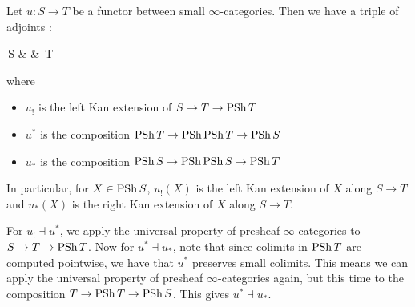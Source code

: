 \documentclass[./main.tex]{subfiles}
\begin{document}
\begin{lem}
  
  Let $u : S \to T$ be a functor between small $\infty$-categories.
  Then we have a triple of adjoints : 
  \begin{cd}
    {\,S} & {} & {\,T}
    \arrow["{u^*}"{description}, from=1-3, to=1-1]
    \arrow["{\mathrm{u_!}}", shift left=5, from=1-1, to=1-3]
    \arrow["{u_*}"', shift right=5, from=1-1, to=1-3]
    \arrow["\bot"{description}, shift left=3, draw=none, from=1-1, to=1-3]
    \arrow["\bot"{description}, shift right=3, draw=none, from=1-1, to=1-3]
  \end{cd}
  where 
  \begin{itemize}
    \item $u_!$ is the left Kan extension of $S \to T \to \mathrm{PSh}\,T$
    \item $u^*$ is the composition $\mathrm{PSh}\,T \to \mathrm{PSh}\,\mathrm{PSh}\,T \to \mathrm{PSh}\,S$
    \item $u_*$ is the composition $\mathrm{PSh}\,S \to \mathrm{PSh}\,\mathrm{PSh}\,S \to \mathrm{PSh}\,T$
  \end{itemize}
  In particular, for $X \in \mathrm{PSh}\,S$,
  $u_!(X)$ is the left Kan extension of $X$ along $S \to T$
  and $u_*(X)$ is the right Kan extension of $X$ along $S \to T$.
  \begin{proof1}
    For $u_! \dashv u^*$, we apply the universal property of
    presheaf $\infty$-categories to $S \to T \to \mathrm{PSh}\,T$.
    Now for $u^* \dashv u_*$, note that
    since colimits in $\mathrm{PSh}\,T$ are computed pointwise,
    we have that $u^*$ preserves small colimits.
    This means we can apply the universal property of 
    presheaf $\infty$-categories again,
    but this time to the composition $T \to \mathrm{PSh}\,T \to \mathrm{PSh}\,S$.
    This gives $u^* \dashv u_*$. 
  \end{proof1}
\end{lem}
\end{document}
